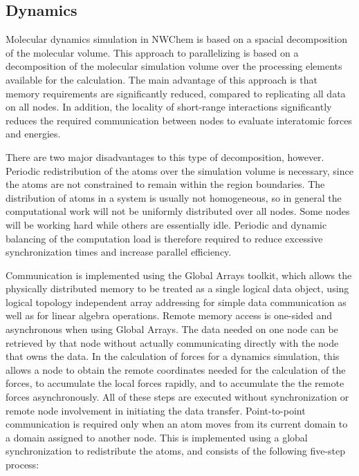 \subsection{Dynamics}

Molecular dynamics simulation in NWChem is based on a spacial
decomposition of the molecular volume.  This approach to parallelizing
is based on a decomposition of the molecular simulation 
volume over the processing elements available for the calculation.
The main advantage of this approach is that memory requirements are significantly
reduced, compared to replicating all data on all nodes.
In addition, the locality of short-range interactions significantly 
reduces the required communication between nodes to evaluate interatomic
forces and energies.

There are two major disadvantages to this type of decomposition, however.
Periodic redistribution of the atoms over the simulation volume is necessary,
since the atoms are not constrained to remain within the region boundaries.
The distribution of atoms in a system is usually not homogeneous, so in
general the computational work will not be uniformly distributed over all
nodes.  Some nodes will be working hard while others are essentially idle.
Periodic and dynamic balancing of the computation load is therefore required
to reduce excessive synchronization times and increase parallel efficiency.

Communication is implemented using the Global Arrays toolkit, which allows the
physically distributed memory to be treated as a single logical data object,
using logical topology independent array addressing for simple data communication 
as well as for linear algebra operations.  Remote memory access is one-sided
and asynchronous when using Global Arrays.  The data needed on one node
can be retrieved by that node
without actually communicating directly with the node that owns the
data.  In the calculation of forces for a dynamics simulation, this allows
a node to obtain the 
remote coordinates needed for the calculation of the forces, to
accumulate the local forces rapidly, and to 
accumulate the the remote forces
asynchronously.  All of these steps are executed without synchronization
or remote node involvement in initiating the data transfer.
Point-to-point communication is required only when an atom moves from its
current domain to a domain assigned to another node.  This is implemented using
a global synchronization to redistribute the atoms, and consists of the following
five-step process:


